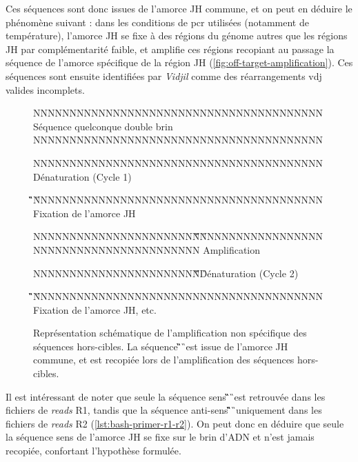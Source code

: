 Ces séquences sont donc issues de l'amorce JH commune, et on peut en déduire le
phénomène suivant : dans les conditions de \gls{pcr} utilisées (notamment de
température), l'amorce JH se fixe à des régions du génome autres que les
régions JH par complémentarité faible, et amplifie ces régions recopiant au
passage la séquence de l'amorce spécifique de la région JH
(\autoref{fig:off-target-amplification}). Ces séquences sont ensuite
identifiées par \textit{Vidjil} comme des réarrangements \gls{vdj} valides
incomplets.

\begin{figure}[H]
    \centering
    \begin{ColoredVerbatim}
        
        NNNNNNNNNNNNNNNNNNNNNNNNNNNNNNNNNNNNNNNN Séquence quelconque double brin
        NNNNNNNNNNNNNNNNNNNNNNNNNNNNNNNNNNNNNNNN

        NNNNNNNNNNNNNNNNNNNNNNNNNNNNNNNNNNNNNNNN Dénaturation (Cycle 1)

                               \C\G\T\C\T\C\C\T\C\A\G\G\T\A\A\G
        NNNNNNNNNNNNNNNNNNNNNNNNNNNNNNNNNNNNNNNN Fixation de l'amorce JH


        NNNNNNNNNNNNNNNNNNNNNNN\C\G\T\C\T\C\C\T\C\A\G\G\T\A\A\G
        NNNNNNNNNNNNNNNNNNNNNNNNNNNNNNNNNNNNNNNN Amplification

        NNNNNNNNNNNNNNNNNNNNNNN\C\G\T\C\T\C\C\T\C\A\G\G\T\A\A\G Dénaturation (Cycle 2)

                               \C\G\T\C\T\C\C\T\C\A\G\G\T\A\A\G
        NNNNNNNNNNNNNNNNNNNNNNNNNNNNNNNNNNNNNNNN Fixation de l'amorce JH, etc.
    \end{ColoredVerbatim}
    \caption{
        Représentation schématique de l'amplification non spécifique des séquences hors-cibles. 
        La séquence \C\G\T\C\T\C\C\T\C\A\G\G\T\A\A\G\ est issue de l'amorce JH commune, et est recopiée 
        lors de l'amplification des séquences hors-cibles.
    }
    \label{fig:off-target-amplification}
\end{figure}

Il est intéressant de noter que seule la séquence sens
\C\G\T\C\T\C\C\T\C\A\G\G\T\A\A\G\ est retrouvée dans les fichiers de
\textit{reads} R1, tandis que la séquence anti-sens
\C\T\T\A\C\C\T\G\A\G\G\A\G\A\C\G\ uniquement dans les fichiers de
\textit{reads} R2 (\autoref{lst:bash-primer-r1-r2}). On peut donc en déduire
que seule la séquence sens de l'amorce JH se fixe sur le brin d'ADN et n'est
jamais recopiée, confortant l'hypothèse formulée.

